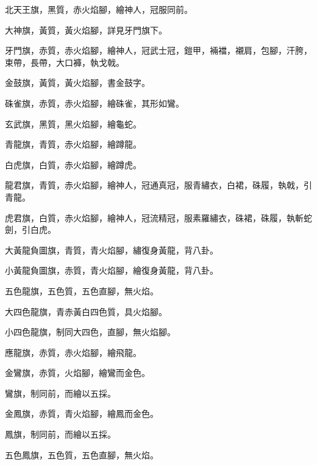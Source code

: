 \begin{pinyinscope}
 北天王旗，黑質，赤火焰腳，繪神人，冠服同前。



 大神旗，黃質，黃火焰腳，詳見牙門旗下。



 牙門旗，赤質，赤火焰腳，繪神人，冠武士冠，鎧甲，裲襠，襯肩，包腳，汗胯，束帶，長帶，大口褲，執戈戟。



 金鼓旗，黃質，黃火焰腳，書金鼓字。



 硃雀旗，赤質，赤火焰腳，繪硃雀，其形如鸞。



 玄武旗，黑質，黑火焰腳，繪龜蛇。



 青龍旗，青質，赤火焰腳，繪蹲龍。



 白虎旗，白質，赤火焰腳，繪蹲虎。



 龍君旗，青質，赤火焰腳，繪神人，冠通真冠，服青繡衣，白裙，硃履，執戟，引青龍。



 虎君旗，白質，赤火焰腳，繪神人，冠流精冠，服素羅繡衣，硃裙，硃履，執斬蛇劍，引白虎。



 大黃龍負圖旗，青質，青火焰腳，繡復身黃龍，背八卦。



 小黃龍負圖旗，赤質，青火焰腳，繪復身黃龍，背八卦。



 五色龍旗，五色質，五色直腳，無火焰。



 大四色龍旗，青赤黃白四色質，具火焰腳。



 小四色龍旗，制同大四色，直腳，無火焰腳。



 應龍旗，赤質，赤火焰腳，繪飛龍。



 金鸞旗，赤質，火焰腳，繪鸞而金色。



 鸞旗，制同前，而繪以五採。



 金鳳旗，赤質，青火焰腳，繪鳳而金色。



 鳳旗，制同前，而繪以五採。



 五色鳳旗，五色質，五色直腳，無火焰。




\end{pinyinscope}
